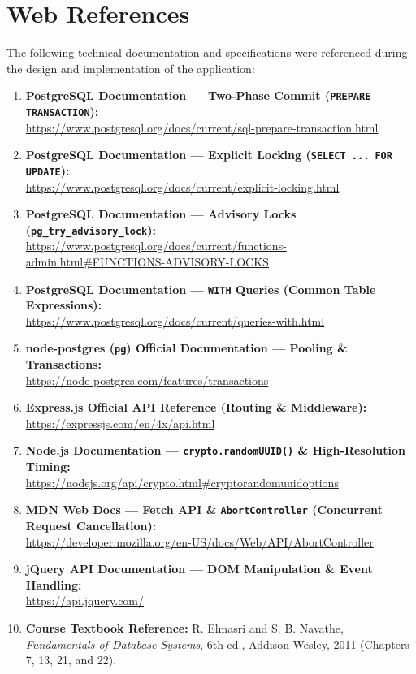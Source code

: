 \documentclass[11pt, a4paper]{article}
\begin{document}
\section{Web References}
The following technical documentation and specifications were referenced during the design and implementation of the application:
\begin{enumerate}
    \item \textbf{PostgreSQL Documentation --- Two-Phase Commit (\texttt{PREPARE TRANSACTION}):} \\
    \url{https://www.postgresql.org/docs/current/sql-prepare-transaction.html}
    \item \textbf{PostgreSQL Documentation --- Explicit Locking (\texttt{SELECT ... FOR UPDATE}):} \\
    \url{https://www.postgresql.org/docs/current/explicit-locking.html}
    \item \textbf{PostgreSQL Documentation --- Advisory Locks (\texttt{pg\_try\_advisory\_lock}):} \\
    \url{https://www.postgresql.org/docs/current/functions-admin.html#FUNCTIONS-ADVISORY-LOCKS}
    \item \textbf{PostgreSQL Documentation --- \texttt{WITH} Queries (Common Table Expressions):} \\
    \url{https://www.postgresql.org/docs/current/queries-with.html}
    \item \textbf{node-postgres (\texttt{pg}) Official Documentation --- Pooling \& Transactions:} \\
    \url{https://node-postgres.com/features/transactions}
    \item \textbf{Express.js Official API Reference (Routing \& Middleware):} \\
    \url{https://expressjs.com/en/4x/api.html}
    \item \textbf{Node.js Documentation --- \texttt{crypto.randomUUID()} \& High-Resolution Timing:} \\
    \url{https://nodejs.org/api/crypto.html#cryptorandomuuidoptions}
    \item \textbf{MDN Web Docs --- Fetch API \& \texttt{AbortController} (Concurrent Request Cancellation):} \\
    \url{https://developer.mozilla.org/en-US/docs/Web/API/AbortController}
    \item \textbf{jQuery API Documentation --- DOM Manipulation \& Event Handling:} \\
    \url{https://api.jquery.com/}
    \item \textbf{Course Textbook Reference:} R. Elmasri and S. B. Navathe, \textit{Fundamentals of Database Systems}, 6th ed., Addison-Wesley, 2011 (Chapters 7, 13, 21, and 22).
\end{enumerate}
\end{document}
